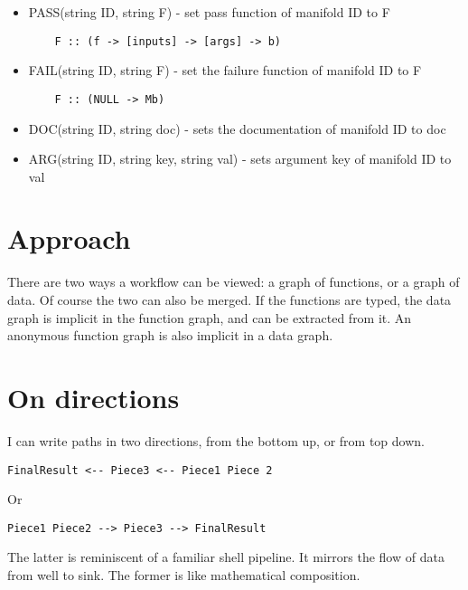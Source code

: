 \documentclass[12pt]{article}
\begin{document}
\begin{itemize}
  \item PASS(string ID, string F) - set pass function of manifold ID to F

\begin{verbatim}
    F :: (f -> [inputs] -> [args] -> b)
\end{verbatim}

  \item FAIL(string ID, string F) - set the failure function of manifold ID to F

\begin{verbatim}
    F :: (NULL -> Mb)
\end{verbatim}

  \item DOC(string ID, string doc) - sets the documentation of manifold ID to doc

  \item ARG(string ID, string key, string val) - sets argument key of manifold ID to val

\end{itemize}

\section{Approach}

There are two ways a workflow can be viewed: a graph of functions, or a graph
of data. Of course the two can also be merged. If the functions are typed, the
data graph is implicit in the function graph, and can be extracted from it. An
anonymous function graph is also implicit in a data graph.

\section{On directions}

I can write paths in two directions, from the bottom up, or from top down.

\begin{verbatim}
FinalResult <-- Piece3 <-- Piece1 Piece 2
\end{verbatim}

Or

\begin{verbatim}
Piece1 Piece2 --> Piece3 --> FinalResult
\end{verbatim}

The latter is reminiscent of a familiar shell pipeline. It mirrors the flow of
data from well to sink. The former is like mathematical composition.
\end{document}
